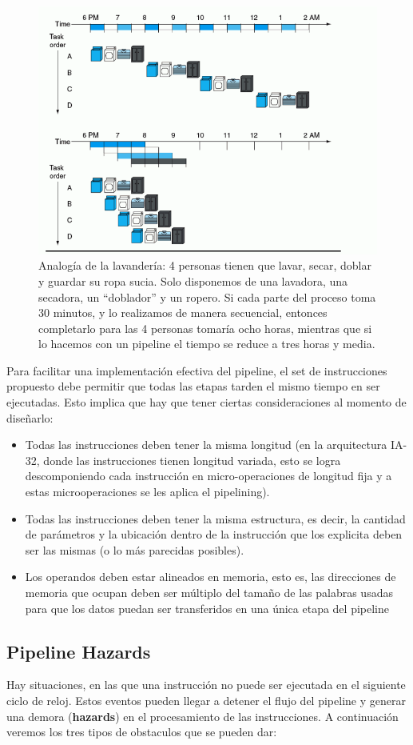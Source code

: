 \begin{figure}[h]
	\centering
	\includegraphics[width=0.5\linewidth]{imagenes/pipelining}
	\caption{Analogía de la lavandería: 4 personas tienen que lavar, secar, doblar y guardar su ropa sucia. Solo disponemos de una lavadora, una secadora, un ``doblador'' y un ropero. Si cada parte del proceso toma 30 minutos, y lo realizamos de manera secuencial, entonces completarlo para las 4 personas tomaría ocho horas, mientras que si lo hacemos con un pipeline el tiempo se reduce a tres horas y media.}
	\label{fig:pipelining}
\end{figure}

Para facilitar una implementación efectiva del pipeline, el set de instrucciones propuesto debe permitir que todas las etapas tarden el mismo tiempo en ser ejecutadas. Esto implica que hay que tener ciertas consideraciones al momento de diseñarlo:

\begin{itemize}
	\item Todas las instrucciones deben tener la misma longitud (en la arquitectura IA-32, donde las instrucciones tienen longitud variada, esto se logra descomponiendo cada instrucción en micro-operaciones de longitud fija y a estas microoperaciones se les aplica el pipelining).
	\item Todas las instrucciones deben tener la misma estructura, es decir, la cantidad de parámetros y la ubicación dentro de la instrucción que los explicita deben ser las mismas (o lo más parecidas posibles). 
	\item Los operandos deben estar alineados en memoria, esto es, las direcciones de memoria que ocupan deben ser múltiplo del tamaño de las palabras usadas para que los datos puedan ser transferidos en una única etapa del pipeline
\end{itemize}

\subsection{Pipeline Hazards}
Hay situaciones, en las que una instrucción no puede ser ejecutada en el siguiente ciclo de reloj. Estos eventos pueden llegar a detener el flujo del pipeline y generar una demora (\textbf{hazards}) en el procesamiento de las instrucciones. A continuación veremos los tres tipos de obstaculos que se pueden dar:

